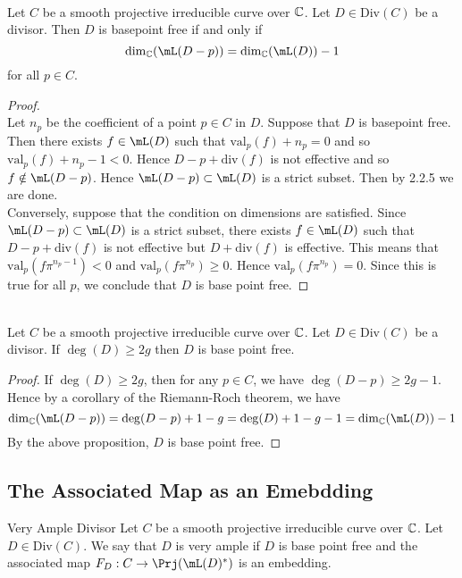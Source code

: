 \documentclass[a4paper]{article}
\begin{document}
\begin{prp}{}{}\\
Let $C$ be a smooth projective irreducible curve over $\mathbb{C}$. Let $D\in\text{Div}(C)$ be a divisor. Then $D$ is basepoint free if and only if $$\dim_\C(\mL(D-p))=\dim_\C(\mL(D))-1$$ for all $p\in C$. 
\begin{proof}\\
Let $n_p$ be the coefficient of a point $p\in C$ in $D$. Suppose that $D$ is basepoint free. Then there exists $f\in\mL(D)$ such that $\text{val}_p(f)+n_p=0$ and so $\text{val}_p(f)+n_p-1<0$. Hence $D-p+\text{div}(f)$ is not effective and so $f\notin\mL(D-p)$. Hence $\mL(D-p)\subset\mL(D)$ is a strict subset. Then by 2.2.5 we are done. \\

Conversely, suppose that the condition on dimensions are satisfied. Since $\mL(D-p)\subset\mL(D)$ is a strict subset, there exists $f\in\mL(D)$ such that $D-p+\text{div}(f)$ is not effective but $D+\text{div}(f)$ is effective. This means that $\text{val}_p(f\pi^{n_p-1})<0$ and $\text{val}_p(f\pi^{n_p})\geq0$. Hence $\text{val}_p(f\pi^{n_p})=0$. Since this is true for all $p$, we conclude that $D$ is base point free. 
\end{proof}
\end{prp}

\begin{crl}{}{}\\
Let $C$ be a smooth projective irreducible curve over $\mathbb{C}$. Let $D\in\text{Div}(C)$ be a divisor. If $\deg(D)\geq 2g$ then $D$ is base point free. 
\begin{proof}
If $\deg(D)\geq 2g$, then for any $p\in C$, we have $\deg(D-p)\geq 2g-1$. Hence by a corollary of the Riemann-Roch theorem, we have $$\dim_\C(\mL(D-p))=\deg(D-p)+1-g=\deg(D)+1-g-1=\dim_\C(\mL(D))-1$$ By the above proposition, $D$ is base point free. 
\end{proof}
\end{crl}

\subsection{The Associated Map as an Emebdding}
\begin{defn}{Very Ample Divisor}{} Let $C$ be a smooth projective irreducible curve over $\mathbb{C}$. Let $D\in\text{Div}(C)$. We say that $D$ is very ample if $D$ is base point free and the associated map $F_D:C\to\Prj(\mL(D)^\ast)$ is an embedding. 
\end{defn}
\end{document}
